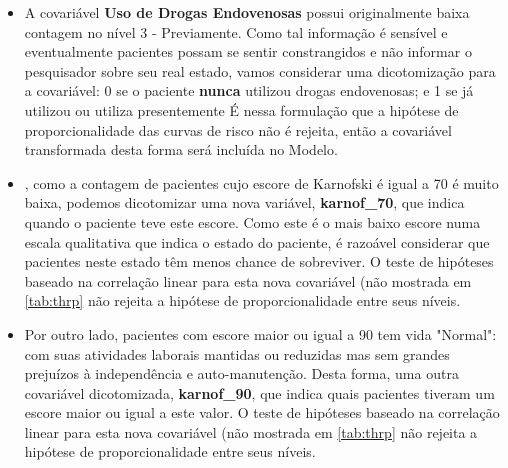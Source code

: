 \documentclass[
	12pt,				%
	openright,			%
	twoside,			%
	a4paper,			%
	english,			%
	brazil				%
	]{abntex2}
\begin{document}
\begin{itemize}
	\item A covariável \textbf{Uso de Drogas Endovenosas} possui originalmente baixa contagem no nível 3 - Previamente. Como tal informação é sensível e eventualmente pacientes possam se sentir constrangidos e não informar o pesquisador sobre seu real estado, vamos considerar uma dicotomização para a covariável: 0 se o paciente \textbf{nunca} utilizou drogas endovenosas; e 1 se já utilizou ou utiliza presentemente É nessa formulação que a hipótese de proporcionalidade das curvas de risco não é rejeita, então a covariável transformada desta forma será incluída no Modelo.
	\item \cite{hosmer}, como a contagem de pacientes cujo escore de Karnofski é igual a 70 é muito baixa, podemos dicotomizar uma nova variável, \textbf{karnof_70}, que indica quando o paciente teve este escore. Como este é o mais baixo escore numa escala qualitativa que indica o estado do paciente, é razoável considerar que pacientes neste estado têm menos chance de sobreviver. O teste de hipóteses baseado na correlação linear para esta nova covariável (não mostrada em \ref{tab:thrp} não rejeita a hipótese de proporcionalidade entre seus níveis.
	\item Por outro lado, pacientes com escore maior ou igual a 90 tem vida "Normal": com suas atividades laborais mantidas ou reduzidas mas sem grandes prejuízos à independência e auto-manutenção. Desta forma, uma outra covariável dicotomizada, \textbf{karnof_90}, que indica quais pacientes tiveram um escore maior ou igual a este valor. O teste de hipóteses baseado na correlação linear para esta nova covariável (não mostrada em \ref{tab:thrp} não rejeita a hipótese de proporcionalidade entre seus níveis.

\end{itemize}
 
\end{document}
